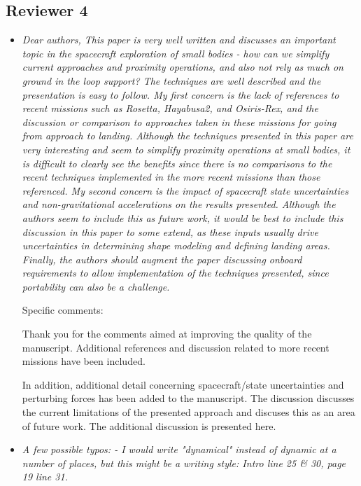 \documentclass[11pt]{article}
\newcommand{\comment}[1]{\item \itshape #1 \normalfont}
\begin{document}
\clearpage\newpage
\subsection*{Reviewer 4}

\begin{itemize}\setlength{\itemsep}{2\parsep}

\comment{    Dear authors,
This paper is very well written and discusses an important topic in the spacecraft exploration of small bodies - how can we simplify current approaches and proximity operations, and also not rely as much on ground in the loop support? The techniques are well described and the presentation is easy to follow.
My first concern is the lack of references to recent missions such as Rosetta, Hayabusa2, and Osiris-Rex, and the discussion or comparison to approaches taken in these missions for going from approach to landing. 
Although the techniques presented in this paper are very interesting and seem to simplify proximity operations at small bodies, it is difficult to clearly see the benefits since there is no comparisons to the recent techniques implemented in the more recent missions than those referenced.
My second concern is the impact of spacecraft state uncertainties and non-gravitational accelerations on the results presented.
Although the authors seem to include this as future work, it would be best to include this discussion in this paper to some extend, as these inputs usually drive uncertainties in determining shape modeling and defining landing areas.  
Finally, the authors should augment the paper discussing onboard requirements to allow implementation of the techniques presented, since portability can also be a challenge.

Specific comments:
}

Thank you for the comments aimed at improving the quality of the manuscript. 
Additional references and discussion related to more recent missions have been included.

In addition, additional detail concerning spacecraft/state uncertainties and perturbing forces has been added to the manuscript.
The discussion discusses the current limitations of the presented approach and discuses this as an area of future work.
The additional discussion is presented here.

\comment{A few possible typos:
- I would write "dynamical" instead of dynamic at a number of places, but this might be a writing style: Intro line 25 \& 30, page 19 line 31.
}


\end{itemize}
\end{document}
